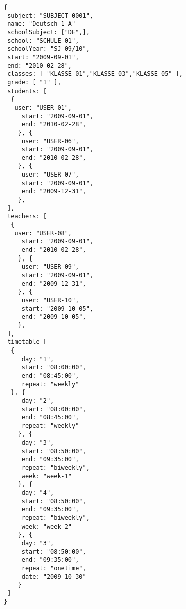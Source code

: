 
\begin{lstlisting}[caption={Beispiel eines Schulfachs},frame=tlrb]
{
 subject: "SUBJECT-0001",
 name: "Deutsch 1-A"
 schoolSubject: ["DE",],
 school: "SCHULE-01",
 schoolYear: "SJ-09/10",
 start: "2009-09-01",
 end: "2010-02-28",
 classes: [ "KLASSE-01","KLASSE-03","KLASSE-05" ],
 grade: [ "1" ],
 students: [
  { 
   user: "USER-01",
	 start: "2009-09-01",
	 end: "2010-02-28",
	}, { 
	 user: "USER-06",
	 start: "2009-09-01",
	 end: "2010-02-28",
	}, { 
	 user: "USER-07",
	 start: "2009-09-01",
	 end: "2009-12-31",
	},
 ],
 teachers: [
  { 
   user: "USER-08",
	 start: "2009-09-01",
	 end: "2010-02-28",
	}, { 
	 user: "USER-09",
	 start: "2009-09-01",
	 end: "2009-12-31",
	}, { 
	 user: "USER-10",
	 start: "2009-10-05",
	 end: "2009-10-05",
	},
 ],
 timetable [
  {
	 day: "1",
	 start: "08:00:00",
	 end: "08:45:00",
	 repeat: "weekly"
  }, {
	 day: "2",
	 start: "08:00:00",
	 end: "08:45:00",
	 repeat: "weekly"
	}, {
	 day: "3",
	 start: "08:50:00",
	 end: "09:35:00",
	 repeat: "biweekly",
	 week: "week-1"
	}, {
	 day: "4",
	 start: "08:50:00",
	 end: "09:35:00",
	 repeat: "biweekly",
	 week: "week-2"
	}, {
	 day: "3",
	 start: "08:50:00",
	 end: "09:35:00",
	 repeat: "onetime",
	 date: "2009-10-30"
	}	 
 ]
}
\end{lstlisting}
